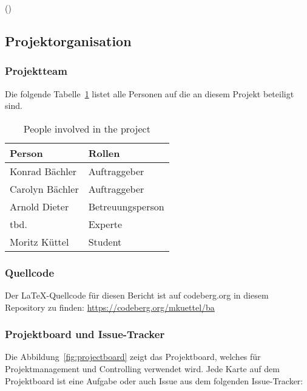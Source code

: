 (\cite[p.~17-22]{siegfried_kaltenecker_kanban_2013})

\subsection{Projektorganisation}

\subsubsection{Projektteam}

Die folgende Tabelle~\ref{tab:projectmembers} listet alle Personen auf die an diesem Projekt beteiligt sind.

\begin{table}[H]
    \begin{tabular}{l p{3.2cm}}
        \toprule
        \bfseries Person   & \bfseries Rollen \\
        \midrule
        Konrad Bächler     & Auftraggeber \\
        \midrule
        Carolyn Bächler    & Auftraggeber \\
        \midrule
        Arnold Dieter      & Betreuungsperson \\
        \midrule
        tbd.               & Experte \\
        \midrule
        Moritz Küttel      & Student \\
        \bottomrule
    \end{tabular}
    \caption{People involved in the project}\label{tab:projectmembers}
\end{table}

\subsubsection{Quellcode}

Der \LaTeX-Quellcode für diesen Bericht ist auf codeberg.org in diesem Repository zu finden:
\url{https://codeberg.org/mkuettel/ba}


\subsubsection{Projektboard und Issue-Tracker}

Die Abbildung~\ref{fig:projectboard} zeigt das Projektboard, welches für Projektmanagement und Controlling verwendet wird.
Jede Karte auf dem Projektboard ist eine Aufgabe oder auch Issue aus dem folgenden Issue-Tracker:

